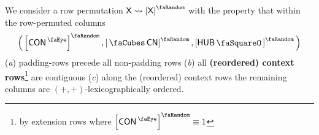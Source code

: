 We consider a row permutation $\col{X}\rightsquigarrow\order{\col{X}}$ with the property that within the row-permuted columns
\[
	\Big(
	\order{\peekContext},
	\order{\cnCn},
	\order{\hubStamp}
	\Big)
\]
(\emph{a}) padding-rows precede all non-padding rows
(\emph{b}) all \textbf{(reordered) context rows}\footnote{by extension rows where $\order{\peekContext} \equiv 1$} are contiguous
(\emph{c}) along the (reordered) context rows the remaining columns are $(+, +)$-lexicographically ordered.
